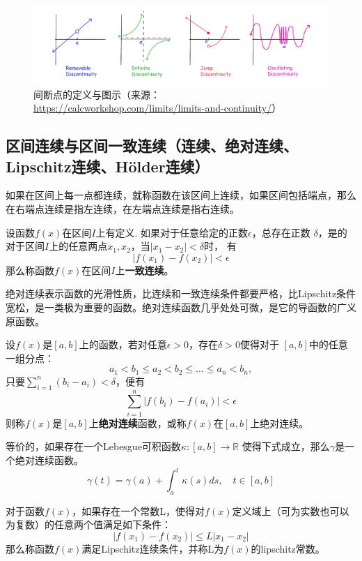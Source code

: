 \begin{figure}[!hbp]
\centering
\includegraphics[width=\linewidth]{asserts/4-types-of-discontinuity.png}
\caption{
  间断点的定义与图示（来源：\url{https://calcworkshop.com/limits/limits-and-continuity/}）
}
\end{figure}

\subsection{区间连续与区间一致连续（连续、绝对连续、Lipschitz连续、Hölder连续）}

如果在区间上每一点都连续，就称函数在该区间上连续，如果区间包括端点，那么在右端点连续是指左连续，在左端点连续是指右连续。

\begin{definition}[区间连续]
设函数\(f(x)\)在区间\(I\)上有定义.
如果对于任意给定的正数\(\epsilon\)，总存在正数
\(\delta\)，是的对于区间\(I\)上的任意两点\(x_1,x_2\)，当\(|x_1-x_2|<\delta\)时，
有 \[
|f(x_1)-f(x_2)|<\epsilon
\] 那么称函数\(f(x)\)在区间\(I\)上\textbf{一致连续}。
\end{definition}

绝对连续表示函数的光滑性质，比连续和一致连续条件都要严格，比Lipschitz条件宽松，是一类极为重要的函数。绝对连续函数几乎处处可微，是它的导函数的广义原函数。

\begin{definition}[绝对连续]
设\(f(x)\)是\([a,b]\)上的函数，若对任意\(\epsilon>0\)，存在\(\delta>0\)使得对于
\([a,b]\)中的任意一组分点： \[
a_1<b_1\leq a_2 <b_2 \leq \dots \leq a_n < b_n,
\] 只要\(\sum_{i=1}^n(b_i-a_i)<\delta\)，便有 \[
\sum_{i=1}^n|f(b_i)-f(a_i)|<\epsilon
\]
则称\(f(x)\)是\([a,b]\)上\textbf{绝对连续}函数，或称\(f(x)\)在\([a,b]\)上绝对连续。
\end{definition}

等价的，如果存在一个Lebesgue可积函数\(\kappa:[a,b]\to \mathbb{R}\)
使得下式成立，那么\(\gamma\)是一个绝对连续函数。 \[
\gamma(t)=\gamma(a)+\int^t_a \kappa(s)d s,\quad t\in [a,b]
\]

\begin{definition}[Lipschitz连续]
对于函数\(f(x)\)，如果存在一个常数L，使得对\(f(x)\)定义域上（可为实数也可以为复数）的任意两个值满足如下条件：
\[
|f(x_1)-f(x_2)|\leq L|x_1-x_2|
\]
那么称函数\(f(x)\)满足Lipschitz连续条件，并称L为\(f(x)\)的lipschitz常数。
\end{definition}

